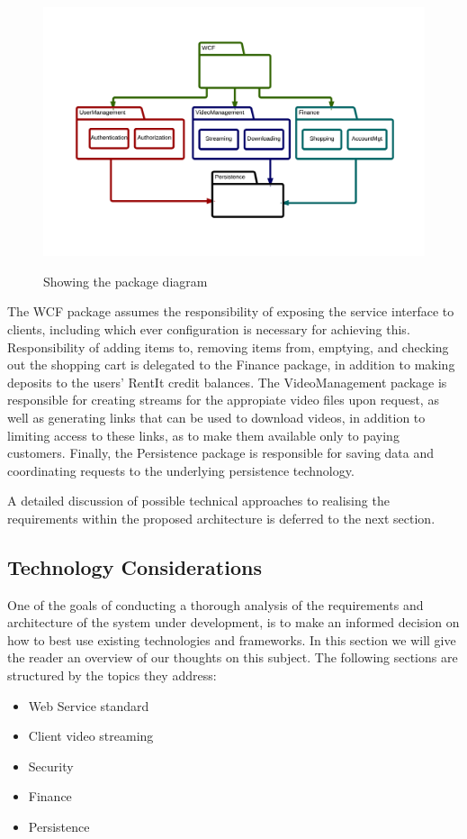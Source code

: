 \begin{figure}[H]
\centering
\includegraphics[scale=0.1]{PackageDiagram.png}
\label{packagediagram}
\caption{Showing the package diagram}
\end{figure}

The WCF package assumes the responsibility of exposing the service interface to clients, including which ever configuration is necessary for achieving this. Responsibility of adding items to, removing items from, emptying, and checking out the shopping cart is delegated to the Finance package, in addition to making deposits to the users' RentIt credit balances.
The VideoManagement package is responsible for creating streams for the appropiate video files upon request, as well as generating links that can be used to download videos, in addition to limiting access to these links, as to make them available only to paying customers. Finally, the Persistence package is responsible for saving data and coordinating requests to the underlying persistence technology.

A detailed discussion of possible technical approaches to realising the requirements within the proposed architecture is deferred to the next section.


\subsection{Technology Considerations}
One of the goals of conducting a thorough analysis of the requirements and architecture of the system under development, is to make an informed decision on how to best use existing technologies and frameworks. In this section we will give the reader an overview of our thoughts on this subject. The following sections are structured by the topics they address:
\begin{itemize}
\item Web Service standard
\item Client video streaming
\item Security
\item Finance
\item Persistence
\end{itemize}

